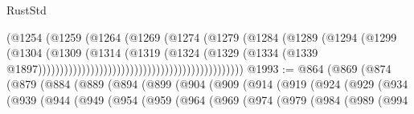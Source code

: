 \begin{lexlean}{RustStd}
\begin{coremodule}
                                                              (@1254
                                                                (@1259
                                                                  (@1264
                                                                    (@1269
                                                                      (@1274
                                                                        (@1279
                                                                          (@1284
                                                                            (@1289
                                                                              (@1294
                                                                                (@1299
                                                                                  (@1304
                                                                                    (@1309
                                                                                      (@1314
                                                                                        (@1319
                                                                                          (@1324
                                                                                            (@1329
                                                                                              (@1334
                                                                                                (@1339
                                                                                                  @1897)))))))))))))))))))))))))))))))))))))))))))))))
@1993 := @864
    (@869
      (@874
        (@879
          (@884
            (@889
              (@894
                (@899
                  (@904
                    (@909
                      (@914
                        (@919
                          (@924
                            (@929
                              (@934
                                (@939
                                  (@944
                                    (@949
                                      (@954
                                        (@959
                                          (@964
                                            (@969
                                              (@974
                                                (@979
                                                  (@984
                                                    (@989
                                                      (@994

\end{coremodule}
\end{lexlean}

